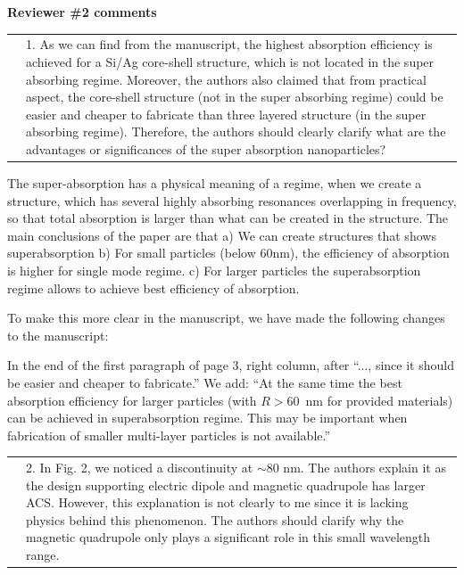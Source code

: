 \documentclass[a4paper]{article}
\begin{document}
\newpage
\begin{minipage}{1.0\linewidth}
  \textbf{Reviewer \#2 comments}\\
  \begin{tabular}[!H]{l|p{}}
    \quad & 1.  As we can find from the manuscript, the highest
    absorption efficiency is achieved for a Si/Ag core-shell
    structure, which is not located in the super absorbing
    regime. Moreover, the authors also claimed that from practical
    aspect, the core-shell structure (not in the super absorbing
    regime) could be easier and cheaper to fabricate than three
    layered structure (in the super absorbing regime). Therefore, the
    authors should clearly clarify what are the advantages or
    significances of the super absorption nanoparticles? 
\end{tabular}
\end{minipage}

The super-absorption has a physical meaning of a regime, when we create a structure, which has several highly absorbing resonances overlapping in frequency, so that total absorption is larger than what can be created in the structure. The main conclusions of the paper are that
a) We can create structures that shows superabsorption
b) For small particles (below 60nm), the efficiency of absorption is higher for single mode regime.
c) For larger particles the superabsorption regime allows to achieve best efficiency of absorption. 

To make this more clear in the manuscript, we have made the following changes to the manuscript: 

In the end of the first paragraph of page 3, right column, after ``..., since it should be easier and cheaper to fabricate.'' We add: ``At the same time the best absorption efficiency for larger particles (with $R>60$~nm for provided materials) can be achieved in superabsorption regime. This may be important when fabrication of smaller multi-layer particles is not available.''


\begin{tabular}[!H]{l|p{}}
  \quad &  2.      In Fig. 2, we noticed a discontinuity at $\sim$80
  nm. The authors explain it as the design supporting electric dipole
  and magnetic quadrupole has larger ACS. However, this explanation is
  not clearly to me since it is lacking physics behind this
  phenomenon. The authors should clarify why the magnetic quadrupole
  only plays a significant role in this small wavelength range. 
\end{tabular}
\end{document}
